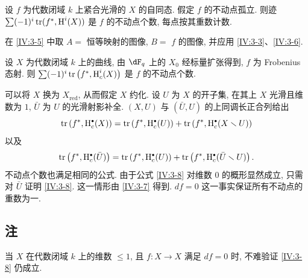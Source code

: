\begin{corollary_}\label{IV:3-7}
设 $f$ 为代数闭域 $k$ 上紧合光滑的 $X$ 的自同态.
假定 $f$ 的不动点孤立. 则迹 $\sum (-1)^i \operatorname{tr}(f^\ast,\operatorname{H}^i(X))$
是 $f$ 的不动点个数, 每点按其重数计数.
\end{corollary_}

在 \ref{IV:3-5} 中取 $A=$ 恒等映射的图像, $B=$ $f$ 的图像,
并应用 \ref{IV:3-3}、\ref{IV:3-6}.

\begin{corollary_}\label{IV:3-8}
设 $X$ 为代数闭域 $k$ 上的曲线, 由 $\dF_q$ 上的 $X_0$ 经标量扩张得到,
$f$ 为 Frobenius 态射. 则 $\sum (-1)^i \operatorname{tr}\left(f^\ast,\operatorname{H}_c^i(X)\right)$
是 $f$ 的不动点个数.
\end{corollary_}

可以将 $X$ 换为 $X_\text{red}$, 从而假定 $X$ 约化.
设 $U$ 为 $X$ 的开子集, 在其上 $X$ 光滑且维数为 $1$, $\bar U$ 为 $U$ 的光滑射影补全.
$(X,U)$ 与 $(\bar U,U)$ 的上同调长正合列给出
\[
  \tr\left(f^\ast,\h_c^\bullet(X)\right) = \tr\left(f^\ast,\h_c^\bullet(U)\right) + \tr\left(f^\ast,\h_c^\bullet(X\setminus U)\right)
\]
以及
\[
  \tr\left(f^\ast,\h_c^\bullet(\bar U)\right) = \tr\left(f^\ast,\h_c^\bullet(U)\right) + \tr\left(f^\ast,\h_c^\bullet(\bar U\setminus U)\right) \text{.}
\]
不动点个数也满足相同的公式.
由于公式 \ref{IV:3-8} 对维数 $0$ 的概形显然成立, 只需对 $\bar U$ 证明 \ref{IV:3-8}.
这一情形由 \ref{IV:3-7} 得到. $d f=0$ 这一事实保证所有不动点的重数为一.

\subsection{注}\label{IV:3-9}

当 $X$ 在代数闭域 $k$ 上的维数 $\leqslant 1$, 且 $f:X\to X$ 满足 $d f=0$ 时,
不难验证 \ref{IV:3-8} 仍成立.
